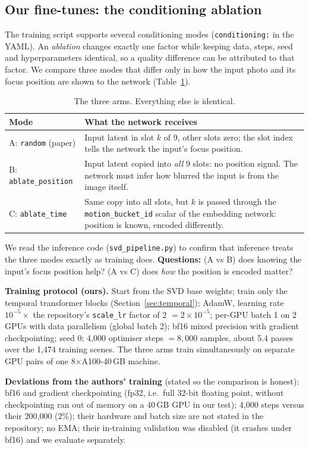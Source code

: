 \documentclass[11pt]{article}
\begin{document}
\subsection{Our fine-tunes: the conditioning ablation}\label{sec:ablation}
The training script supports several conditioning modes (\texttt{conditioning:} in the YAML). An \emph{ablation} changes exactly one factor while keeping data, steps, seed and hyperparameters identical, so a quality difference can be attributed to that factor. We compare three modes that differ only in how the input photo and its focus position are shown to the network (Table~\ref{tab:arms}).
\begin{table}[htbp]\centering
\caption{The three arms. Everything else is identical.}\label{tab:arms}
\begin{tabular}{p{3.9cm}p{9.9cm}}\toprule
Mode & What the network receives\\\midrule
A: \texttt{random} (paper) & Input latent in slot $k$ of 9, other slots zero; the slot index tells the network the input's focus position.\\
B: \texttt{ablate\_position} & Input latent copied into \emph{all} 9 slots: no position signal. The network must infer how blurred the input is from the image itself.\\
C: \texttt{ablate\_time} & Same copy into all slots, but $k$ is passed through the \texttt{motion\_bucket\_id} scalar of the embedding network: position is known, encoded differently.\\
\bottomrule\end{tabular}\end{table}
We read the inference code (\texttt{svd\_pipeline.py}) to confirm that inference treats the three modes exactly as training does. \textbf{Questions:} (A vs B) does knowing the input's focus position help? (A vs C) does \emph{how} the position is encoded matter?

\textbf{Training protocol (ours).} Start from the SVD base weights; train only the temporal transformer blocks (Section~\ref{sec:temporal}); AdamW, learning rate $10^{-5}\times$ the repository's \texttt{scale\_lr} factor of 2 $=2\times10^{-5}$; per-GPU batch 1 on 2 GPUs with data parallelism (global batch 2); bf16 mixed precision with gradient checkpointing; seed 0; 4{,}000 optimiser steps $=8{,}000$ samples, about 5.4 passes over the 1{,}474 training scenes. The three arms train simultaneously on separate GPU pairs of one 8$\times$A100-40\,GB machine.

\textbf{Deviations from the authors' training} (stated so the comparison is honest): bf16 and gradient checkpointing (fp32, i.e.\ full 32-bit floating point, without checkpointing ran out of memory on a 40\,GB GPU in our test); 4{,}000 steps versus their 200{,}000 (2\%); their hardware and batch size are not stated in the repository; no EMA; their in-training validation was disabled (it crashes under bf16) and we evaluate separately.
\end{document}
